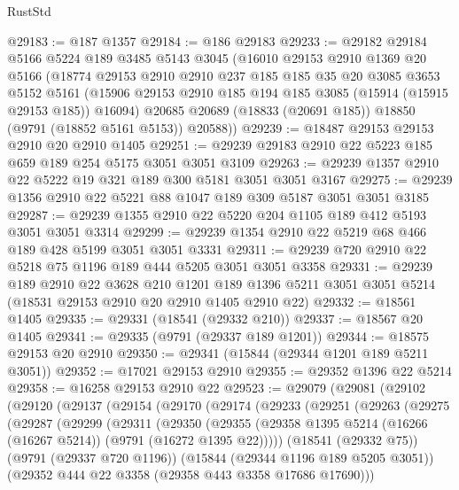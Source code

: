 \begin{lexlean}{RustStd}
\begin{coremodule}
@29183 := @187 @1357
@29184 := @186 @29183
@29233 := @29182
    @29184
    @5166
    @5224
    @189
    @3485
    @5143
    @3045
    (@16010
      @29153
      @2910
      @1369
      @20
      @5166
      (@18774
        @29153
        @2910
        @2910
        @237
        @185
        @185
        @35
        @20
        @3085
        @3653
        @5152
        @5161
        (@15906 @29153 @2910 @185 @194 @185 @3085 (@15914 (@15915 @29153 @185)) @16094)
        @20685
        @20689
        (@18833 (@20691 @185))
        @18850
        (@9791 (@18852 @5161 @5153))
        @20588))
@29239 := @18487 @29153 @29153 @2910 @20 @2910 @1405
@29251 := @29239 @29183 @2910 @22 @5223 @185 @659 @189 @254 @5175 @3051 @3051 @3109
@29263 := @29239 @1357 @2910 @22 @5222 @19 @321 @189 @300 @5181 @3051 @3051 @3167
@29275 := @29239 @1356 @2910 @22 @5221 @88 @1047 @189 @309 @5187 @3051 @3051 @3185
@29287 := @29239 @1355 @2910 @22 @5220 @204 @1105 @189 @412 @5193 @3051 @3051 @3314
@29299 := @29239 @1354 @2910 @22 @5219 @68 @466 @189 @428 @5199 @3051 @3051 @3331
@29311 := @29239 @720 @2910 @22 @5218 @75 @1196 @189 @444 @5205 @3051 @3051 @3358
@29331 := @29239
    @189
    @2910
    @22
    @3628
    @210
    @1201
    @189
    @1396
    @5211
    @3051
    @3051
    @5214
    (@18531 @29153 @2910 @20 @2910 @1405 @2910 @22)
@29332 := @18561 @1405
@29335 := @29331 (@18541 (@29332 @210))
@29337 := @18567 @20 @1405
@29341 := @29335 (@9791 (@29337 @189 @1201))
@29344 := @18575 @29153 @20 @2910
@29350 := @29341 (@15844 (@29344 @1201 @189 @5211 @3051))
@29352 := @17021 @29153 @2910
@29355 := @29352 @1396 @22 @5214
@29358 := @16258 @29153 @2910 @22
@29523 := @29079
    (@29081
      (@29102
        (@29120
          (@29137
            (@29154
              (@29170
                (@29174
                  (@29233
                    (@29251
                      (@29263
                        (@29275
                          (@29287
                            (@29299
                              (@29311
                                (@29350
                                  (@29355
                                    (@29358
                                      @1395
                                      @5214
                                      (@16266 (@16267 @5214))
                                      (@9791 (@16272 @1395 @22)))))
                                (@18541 (@29332 @75))
                                (@9791 (@29337 @720 @1196))
                                (@15844 (@29344 @1196 @189 @5205 @3051))
                                (@29352 @444 @22 @3358 (@29358 @443 @3358 @17686 @17690)))

\end{coremodule}
\end{lexlean}
